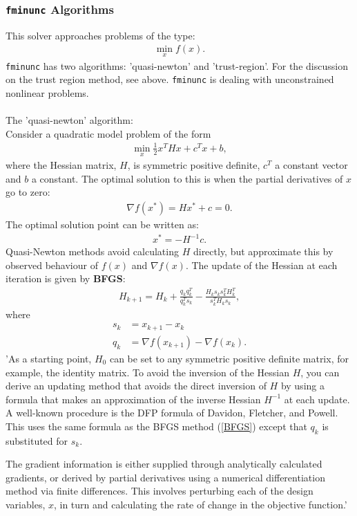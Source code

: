 \documentclass[11pt, a4paper]{article}
\theoremstyle{definition}
\begin{document}
\subsubsection{\texttt{fminunc} Algorithms}
This solver approaches problems of the type:
\begin{align*}
	\min_x f(x).
\end{align*}
\texttt{fminunc} has two algorithms: 'quasi-newton' and 'trust-region'. For the discussion on the trust region method, see above.
\texttt{fminunc} is dealing with unconstrained nonlinear problems.
\\
\\
The 'quasi-newton' algorithm:\\
Consider a quadratic model problem of the form
\begin{align*}
\min_x \frac{1}{2}x^T Hx + c^Tx + b,
\end{align*}
where the Hessian matrix, $H$, is symmetric positive definite, $c^T$ a constant vector and $b$ a constant. 
The optimal solution to this is when the partial derivatives of $x$ go to zero:
\begin{align*}
\nabla f(x^*) = Hx^* + c =0.
\end{align*}
The optimal solution point can be written as:
\begin{align*}
x^* = -H^{-1}c.
\end{align*}
Quasi-Newton methods avoid calculating $H$ directly, but approximate this by observed behaviour of $f(x)$ and $\nabla f(x)$.
The update of the Hessian at each iteration is given by \textbf{BFGS}:
\begin{align}\label{BFGS}
H_{k+1}= H_k + \frac{q_k q_k^T}{q_k^Ts_k}- \frac{H_k s_k s_k^T H_k^T}{s_k^TH_ks_k},
\end{align}
where
\begin{align*}
s_k &= x_{k+1}-x_k\\
q_k &= \nabla f(x_{k+1}) - \nabla f(x_k).
\end{align*}
'As a starting point, $H_0$ can be set to any symmetric positive definite matrix, for example, the identity matrix. To avoid the inversion of the Hessian $H$, you can derive an updating method that avoids the direct inversion of $H$ by using a formula that makes an approximation of the inverse Hessian $H^{-1}$ at each update. A well-known procedure is the DFP formula of Davidon, Fletcher, and Powell. This uses the same formula as the BFGS method (\ref{BFGS}) except that $q_k$ is substituted for $s_k$.

The gradient information is either supplied through analytically calculated gradients, or derived by partial derivatives using a numerical differentiation method via finite differences. This involves perturbing each of the design variables, $x$, in turn and calculating the rate of change in the objective function.'
\end{document}
